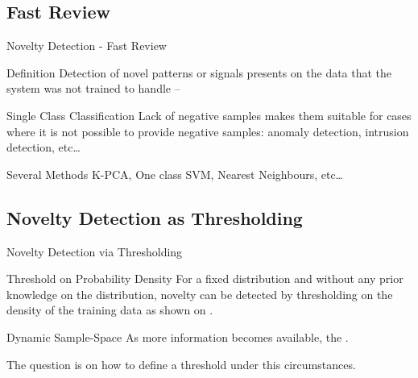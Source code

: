 \documentclass[compress]{beamer}
\begin{document}
\subsection{Fast Review}
\begin{frame}{Novelty Detection - Fast Review}
  \begin{block}{Definition}
    Detection of novel patterns or signals presents on the data that the system was not trained
    to handle -- \cite{markou2003novelty}
  \end{block}
  \begin{block}{Single Class Classification}
    Lack of negative samples makes them suitable for cases where it is not possible to
    provide negative samples: anomaly detection, intrusion detection, etc\dots
  \end{block}
  \begin{block}{Several Methods}
    K-PCA, One class SVM, Nearest Neighbours, etc\dots
  \end{block}
\end{frame}

\subsection{Novelty Detection as Thresholding}
\begin{frame}{Novelty Detection via Thresholding}

\begin{block}{Threshold on Probability Density}
For a fixed distribution and without any prior knowledge on the distribution,
novelty can be detected by thresholding on the density of
the training data as shown on \cite{bishop1994novelty}.
\end{block}

\begin{block}{Dynamic Sample-Space}
As more information becomes available, the .

The question is on how to define a threshold under this circumstances. 
\end{block}
\end{frame}
\end{document}

